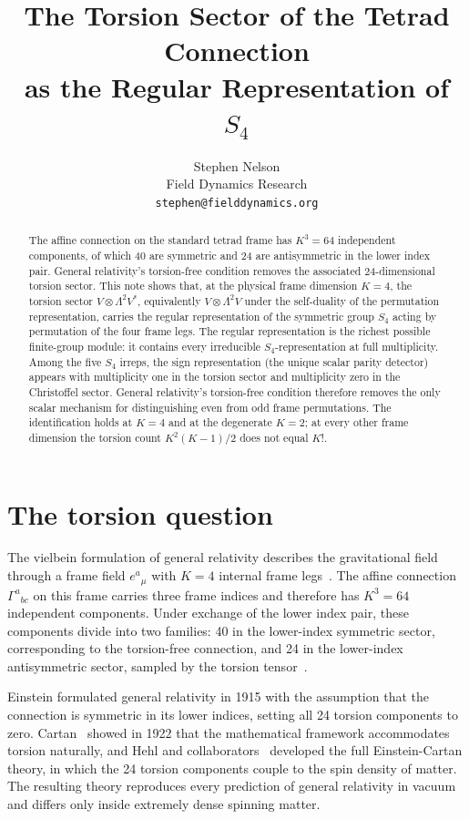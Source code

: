 \documentclass[11pt]{article}
\title{The Torsion Sector of the Tetrad Connection\\
as the Regular Representation of $S_4$}
\author{Stephen Nelson\\
\small Field Dynamics Research\\
\small\texttt{stephen@fielddynamics.org}}
\date{}
\begin{document}
\maketitle

\begin{abstract}
The affine connection on the standard tetrad frame has $K^3=64$
independent components, of which 40 are symmetric and 24 are
antisymmetric in the lower index pair.  General relativity's torsion-free condition removes the
associated 24-dimensional torsion sector.
This note shows that, at the physical frame dimension $K=4$,
the torsion sector $V\otimes\Lambda^2V^*$, equivalently
$V\otimes\Lambda^2V$ under the self-duality of the permutation
representation, carries the regular
representation of the symmetric group $S_4$ acting by
permutation of the four frame legs.  The regular representation
is the richest possible finite-group module: it contains every
irreducible $S_4$-representation at full multiplicity.  Among the
five $S_4$ irreps, the sign representation (the unique scalar
parity detector) appears with multiplicity one in the torsion
sector and multiplicity zero in the Christoffel sector.  General
relativity's torsion-free condition therefore removes the only
scalar mechanism for distinguishing even from odd frame
permutations.  The identification holds
at $K=4$ and at the degenerate $K=2$; at every other frame
dimension the torsion count $K^2(K-1)/2$ does not equal $K!$.
\end{abstract}


\section{The torsion question}

The vielbein formulation of general relativity describes the
gravitational field through a frame field $e^a{}_\mu$ with $K=4$
internal frame legs~\cite{Wald1984,Hehl1976}.  The affine
connection $\Gamma^a{}_{bc}$ on this frame carries three frame
indices and therefore has $K^3=64$ independent components.  Under
exchange of the lower index pair, these components divide into two
families: 40 in the lower-index symmetric sector, corresponding to
the torsion-free connection, and 24 in the lower-index
antisymmetric sector, sampled by the torsion
tensor~\cite{Hehl1976}.

Einstein formulated general relativity in 1915 with the assumption
that the connection is symmetric in its lower indices, setting all
24 torsion components to zero.  Cartan~\cite{Cartan1922} showed in
1922 that the mathematical framework accommodates torsion naturally,
and Hehl and collaborators~\cite{Hehl1976} developed the full
Einstein-Cartan theory, in which the 24 torsion components couple
to the spin density of matter.  The resulting theory reproduces
every prediction of general relativity in vacuum and differs only
inside extremely dense spinning matter.
\end{document}
